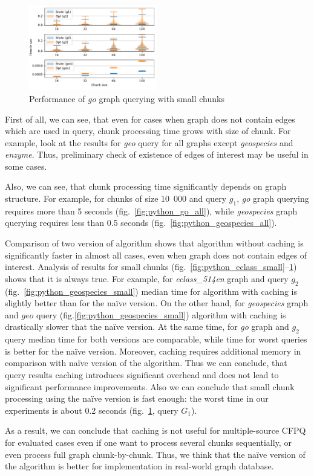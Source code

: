 \begin{figure}[h]
\centering
\includegraphics[width=0.5\textwidth]{data/raw/go_4.pdf}
\caption{Performance of \textit{go} graph querying with small chunks}
\label{fig:python_go_small}
\end{figure}


First of all, we can see, that even for cases when graph does not contain edges which are used in query, chunk processing time grows with size of chunk. 
For example, look at the results for \textit{geo} query for all graphs except \textit{geospecies} and \textit{enzyme}.
Thus, preliminary check of existence of edges of interest may be useful in some cases.

Also, we can see, that chunk processing time significantly depends on graph structure. 
For example, for chunks of size 10~000 and query $g_1$, \textit{go} graph querying requires more than 5 seconds (fig.~\ref{fig:python_go_all}), while \textit{geospecies} graph querying requires less than 0.5 seconds (fig.~\ref{fig:python_geospecies_all}).  

Comparison of two version of algorithm shows that algorithm without caching is significantly faster in almost all cases, even when graph does not contain edges of interest. 
Analysis of results for small chunks (fig.~\ref{fig:python_eclass_small}--\ref{fig:python_go_small}) shows that it is always true. 
For example, for \textit{eclass\_514en} graph and query $g_2$ (fig.~\ref{fig:python_geospecies_small}) median time for algorithm with caching is slightly better than for the na\"{i}ve version.
On the other hand, for \textit{geospecies} graph and $geo$ query (fig.\ref{fig:python_geospecies_small}) algorithm with caching is drastically slower that the na\"{i}ve version.
At the same time, for \textit{go} graph and $g_2$ query median time for both versions are comparable, while time for worst queries is better for the na\"{i}ve version.
Moreover, caching requires additional memory in comparison with na\"{i}ve version of the algorithm.
Thus we can conclude, that query results caching introduces significant overhead and does not lead to significant performance improvements.
Also we can conclude that small chunk processing using the na\"{i}ve version is fast enough: the worst time in our experiments is about 0.2 seconds (fig.~\ref{fig:python_go_small}, query $G_1$). 


As a result, we can conclude that caching is not useful for multiple-source CFPQ for evaluated cases even if one want to process several chunks sequentially, or even process full graph chunk-by-chunk.
Thus, we think that the na\"{i}ve version of the algorithm is better for implementation in real-world graph database. 



